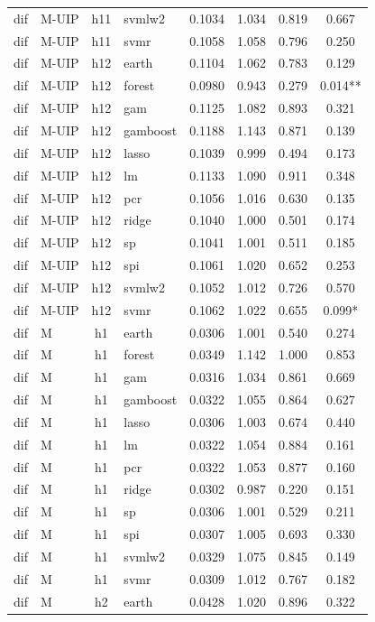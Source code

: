 \begin{ThreePartTable}
\begin{longtable}[t]{llclcccc}
dif & M-UIP & h11 & svmlw2 & 0.1034 & 1.034 & 0.819 & 0.667\\
dif & M-UIP & h11 & svmr & 0.1058 & 1.058 & 0.796 & 0.250\\
\addlinespace
dif & M-UIP & h12 & earth & 0.1104 & 1.062 & 0.783 & 0.129\\
dif & M-UIP & h12 & forest & 0.0980 & 0.943 & 0.279 & 0.014**\\
dif & M-UIP & h12 & gam & 0.1125 & 1.082 & 0.893 & 0.321\\
dif & M-UIP & h12 & gamboost & 0.1188 & 1.143 & 0.871 & 0.139\\
dif & M-UIP & h12 & lasso & 0.1039 & 0.999 & 0.494 & 0.173\\
dif & M-UIP & h12 & lm & 0.1133 & 1.090 & 0.911 & 0.348\\
dif & M-UIP & h12 & pcr & 0.1056 & 1.016 & 0.630 & 0.135\\
dif & M-UIP & h12 & ridge & 0.1040 & 1.000 & 0.501 & 0.174\\
dif & M-UIP & h12 & sp & 0.1041 & 1.001 & 0.511 & 0.185\\
dif & M-UIP & h12 & spi & 0.1061 & 1.020 & 0.652 & 0.253\\
dif & M-UIP & h12 & svmlw2 & 0.1052 & 1.012 & 0.726 & 0.570\\
dif & M-UIP & h12 & svmr & 0.1062 & 1.022 & 0.655 & 0.099*\\
\addlinespace
dif & M & h1 & earth & 0.0306 & 1.001 & 0.540 & 0.274\\
dif & M & h1 & forest & 0.0349 & 1.142 & 1.000 & 0.853\\
dif & M & h1 & gam & 0.0316 & 1.034 & 0.861 & 0.669\\
dif & M & h1 & gamboost & 0.0322 & 1.055 & 0.864 & 0.627\\
dif & M & h1 & lasso & 0.0306 & 1.003 & 0.674 & 0.440\\
dif & M & h1 & lm & 0.0322 & 1.054 & 0.884 & 0.161\\
dif & M & h1 & pcr & 0.0322 & 1.053 & 0.877 & 0.160\\
dif & M & h1 & ridge & 0.0302 & 0.987 & 0.220 & 0.151\\
dif & M & h1 & sp & 0.0306 & 1.001 & 0.529 & 0.211\\
dif & M & h1 & spi & 0.0307 & 1.005 & 0.693 & 0.330\\
dif & M & h1 & svmlw2 & 0.0329 & 1.075 & 0.845 & 0.149\\
dif & M & h1 & svmr & 0.0309 & 1.012 & 0.767 & 0.182\\
\addlinespace
dif & M & h2 & earth & 0.0428 & 1.020 & 0.896 & 0.322\\

\end{longtable}
\end{ThreePartTable}
